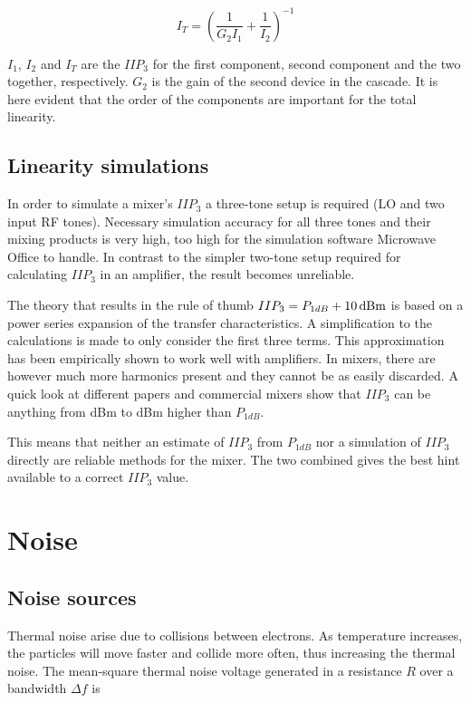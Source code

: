 			\begin{equation}\label{eq:casciip3}
				I_T=\left ( \frac{1}{G_2I_1} + \frac{1}{I_2} \right )^{-1}
			\end{equation}

			$I_1$, $I_2$ and $I_T$ are the $IIP_3$ for the first component, second component and the two together, respectively. $G_2$ is the gain of the second device in the cascade. It is here evident that the order of the components are important for the total linearity.

		\subsection{Linearity simulations}
			In order to simulate a mixer's $IIP_3$ a three-tone setup is required (LO and two input RF tones). Necessary simulation accuracy for all three tones and their mixing products is very high, too high for the simulation software Microwave Office to handle. In contrast to the simpler two-tone setup required for calculating $IIP_3$ in an amplifier, the result becomes unreliable.

			The theory that results in the rule of thumb $IIP_3=P_{1dB}+\unit[10]{dBm}$ is based on a power series expansion of the transfer characteristics. A simplification to the calculations is made to only consider the first three terms. This approximation has been empirically shown to work well with amplifiers. In mixers, there are however much more harmonics present and they cannot be as easily discarded. A quick look at different papers and commercial mixers show that $IIP_3$ can be anything from \unit[6]{dBm} to \unit[14]{dBm} higher than $P_{1dB}$.

			This means that neither an estimate of $IIP_3$ from $P_{1dB}$ nor a simulation of $IIP_3$ directly are reliable methods for the mixer. The two combined gives the best hint available to a correct $IIP_3$ value.

	\section{Noise}
		\subsection{Noise sources}\label{sec:noise_thermal}
			Thermal noise arise due to collisions between electrons. As temperature increases, the particles will move faster and collide more often, thus increasing the thermal noise. The mean-square thermal noise voltage generated in a resistance $R$ over a bandwidth $\Delta f$ is\autocite{bahl03}

